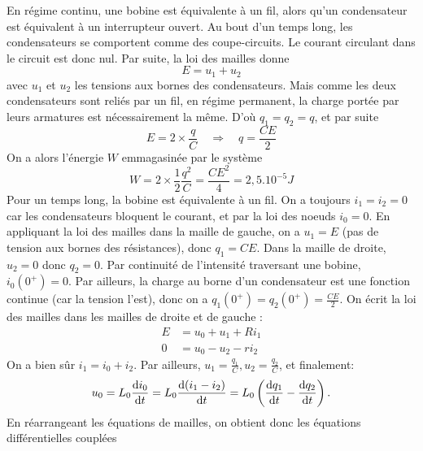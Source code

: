 \begin{solution}
\begin{questions}
    \question En régime continu, une bobine est équivalente à un fil, alors qu'un condensateur est équivalent à un interrupteur ouvert.
    \question  Au bout d'un temps long, les condensateurs se comportent comme des coupe-circuits. Le courant circulant dans le circuit est donc nul. Par suite, la loi des mailles donne
                \begin{equation}
                E = u_1+u_2
                \end{equation}
                avec $u_1$ et $u_2$ les tensions aux bornes des condensateurs. Mais comme les deux condensateurs sont reliés par un fil, en régime permanent, la charge portée par leurs armatures est nécessairement la même. D'où $q_1=q_2=q$, et par suite 
                \begin{equation}
                E=2\times\frac{q}{C} \quad \Longrightarrow \quad \boxed{q = \frac{CE}{2}}
                \end{equation}
    \question On a alors l'énergie $W$ emmagasinée par le système
                \begin{equation}
                W = 2\times\frac{1}{2}\frac{q^2}{C} = \frac{CE^2}{4} = 2,5.10^{-5}J
                \end{equation}
    \question Pour un temps long, la bobine est équivalente à un fil. On a toujours $i_1=i_2=0$ car les condensateurs bloquent le courant, et par la loi des noeuds $i_0=0$. 
              En appliquant la loi des mailles dans la maille de gauche, on a $u_1=E$ (pas de tension aux bornes des résistances), donc $q_1=CE$. Dans la maille de droite, $u_2=0$ donc $q_2=0$.
    \question Par continuité de l'intensité traversant une bobine, $i_0(0^+)=0$. Par ailleurs, la charge au borne d'un condensateur est une fonction continue (car la tension l'est), donc on a $q_1(0^+)=q_2(0^+)=\frac{CE}{2}$.
    \question On écrit la loi des mailles dans les mailles de droite et de gauche :
                \begin{align}
                    E &= u_0+u_1+Ri_1 \\
                    0 &= u_0-u_2-ri_2
                \end{align}
                On a bien sûr $i_1=i_0+i_2$. 
                Par ailleurs, $u_1 = \frac{q_1}{C}, u_2=\frac{q_2}{C}$, et finalement:
                \begin{equation}
                    u_0=L_0\dv{i_0}{t}=L_0\dv{(i_1-i_2)}{t} = L_0\left(\dv{ q_1}{t}-\dv{q_2}{t}\right).
                \end{equation}
                En réarrangeant les équations de mailles, on obtient donc les équations différentielles couplées


\end{questions}
\end{solution}
